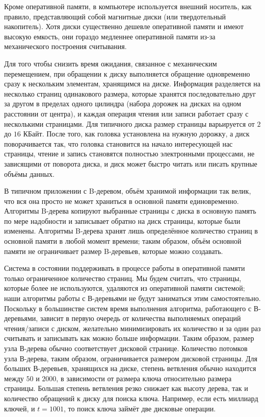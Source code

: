 \documentclass[14pt, russian]{scrartcl}
\begin{document}
Кроме оперативной памяти, в компьютере используется внешний носитель, как правило, представляющий собой магнитные диски (или твердотельный накопитель). Хотя диски существенно дешевле оперативной памяти и имеют высокую емкость, они гораздо медленнее оперативной памяти из-за механического построения считывания.

Для того чтобы снизить время ожидания, связанное с механическим перемещением, при обращении к диску выполняется обращение одновременно сразу к нескольким элементам, хранящимся на диске. Информация разделяется на несколько страниц одинакового размера, которые хранятся последовательно друг за другом в пределах одного цилиндра (набора дорожек на дисках на одном расстоянии от центра), и каждая операция чтения или записи работает сразу с несколькими страницами. Для типичного диска размер страницы варьируется от $2$ до $16$ КБайт. После того, как головка установлена на нужную дорожку, а диск поворачивается так, что головка становится на начало интересующей нас страницы, чтение и запись становятся полностью электронными процессами, не зависящими от поворота диска, и диск может быстро читать или писать крупные объёмы данных.

В типичном приложении с B-деревом, объём хранимой информации так велик, что вся она просто не может храниться в основной памяти единовременно. Алгоритмы B-дерева копируют выбранные страницы с диска в основную память по мере надобности и записывает обратно на диск страницы, которые были изменены. Алгоритмы B-дерева хранят лишь определённое количество страниц в основной памяти в любой момент времени; таким образом, объём основной памяти не ограничивает размер B-деревьев, которые можно создавать.

Система в состоянии поддерживать в процессе работы в оперативной памяти только ограниченное количество страниц. Мы будем считать, что страницы, которые более не используются, удаляются из оперативной памяти системой; наши алгоритмы работы с В-деревьями не будут заниматься этим самостоятельно. Поскольку в большинстве систем время выполнения алгоритма, работающего с В-деревьями, зависит в первую очередь от количества выполняемых операций чтения/записи с диском, желательно минимизировать их количество и за один раз считывать и записывать как можно больше информации. Таким образом, размер узла В-дерева обычно соответствует дисковой странице. Количество потомков узла В-дерева, таким образом, ограничивается размером дисковой страницы. Для больших В-деревьев, хранящихся на диске, степень ветвления обычно находится между $50$ и $2000$, в зависимости от размера ключа относительно размера страницы. Большая степень ветвления резко снижает как высоту дерева, так и количество обращений к диску для поиска ключа. Например, если есть миллиард ключей, и $t=1001$, то поиск ключа займёт две дисковые операции. 
\end{document}
